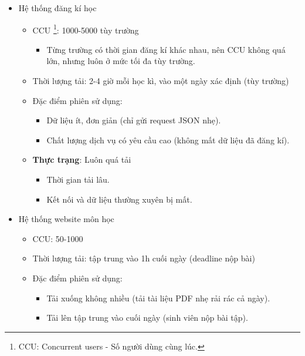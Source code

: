 \documentclass{article}
\begin{document}
\begin{itemize}
    \item Hệ thống đăng kí học
        \begin{itemize}
            \item CCU \footnote{CCU: Concurrent users - Số người dùng cùng
            lúc.}: 1000-5000 tùy trường
                \begin{itemize}
                    \item Từng trường có thời gian đăng kí khác nhau, nên CCU
                    không quá lớn, nhưng luôn ở mức tối đa tùy trường.
                \end{itemize}
            \item Thời lượng tải: 2-4 giờ mỗi học kì, vào một ngày xác định (tùy
            trường)
            \item Đặc điểm phiên sử dụng:
                \begin{itemize}
                    \item Dữ liệu ít, đơn giản (chỉ gửi request JSON nhẹ).
                    \item Chất lượng dịch vụ có yêu cầu cao (không mất dữ liệu
                    đã đăng kí).
                \end{itemize}
            \item \textbf{Thực trạng}: Luôn quá tải
                \begin{itemize}
                    \item Thời gian tải lâu.
                    \item Kết nối và dữ liệu thường xuyên bị mất.
                \end{itemize}
        \end{itemize}
    \item Hệ thống website môn học
        \begin{itemize}
            \item CCU: 50-1000
            \item Thời lượng tải: tập trung vào 1h cuối ngày (deadline nộp bài)
            \item Đặc điểm phiên sử dụng:
                \begin{itemize}
                    \item Tải xuống không nhiều (tải tài liệu PDF nhẹ rải rác cả
                    ngày).
                    \item Tải lên tập trung vào cuối ngày (sinh viên nộp bài
                    tập).
                \end{itemize}

\end{itemize}
\end{itemize}
\end{document}
